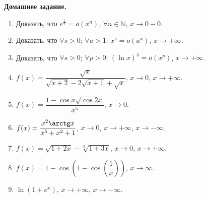 \documentclass[12pt]{article}
\begin{document}
	\begin{center}
		\textbf{\Large{Домашнее задание.}}
	\end{center}
	\begin{enumerate}
		\item Доказать, что $e^{\frac{1}{x}} = \overline{o}\left(x^n\right)$, $\forall n \in \mathbb{N}$, $x \rightarrow 0 - 0$.
		\item Доказать, что $\forall s > 0$; $\forall a > 1$: $x^s = \overline{o}\left(a^x\right)$, $x \rightarrow + \infty$.
		\item Доказать, что $\forall s > 0$; $\forall p > 0$: $\left(\ln x\right)^5 = \overline{o}\left(x^p\right)$, $x \rightarrow + \infty$.
		\item $f(x) = \dfrac{\sqrt{x}}{\sqrt{x + 2} - 2\sqrt{x + 1} + \sqrt{x}}$, $x \rightarrow 0$, $x \rightarrow + \infty$.
		\item $f(x) = \dfrac{1 - \cos x \sqrt{\cos 2x}}{x^5}$, $x \rightarrow 0$.
		\item $f(x) = \dfrac{x^2 \arctg x}{x^5 + x^2 + 1}$, $x \rightarrow 0$, $x \rightarrow + \infty$, $x \rightarrow - \infty$.
		\item $f(x) = \sqrt{1 + 2x} - \sqrt[3]{1 + 3x}$, $x \rightarrow 0$, $x \rightarrow + \infty$.
		\item $f(x) = 1 - \cos \left(1 - \cos \left(\dfrac{1}{x}\right)\right)$, $x \rightarrow \infty$.
		\item $\ln (1 + e^x)$, $x \rightarrow + \infty$, $x \rightarrow - \infty$.
	\end{enumerate}
\end{document}
